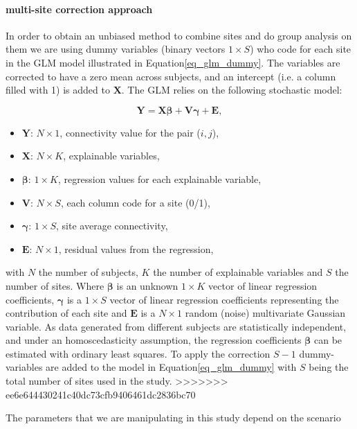 \documentclass[authoryear]{elsarticle}
\begin{document}
\paragraph{multi-site correction approach} 
In order to obtain an unbiased method to combine sites and do group analysis on them we are using dummy variables (binary vectors $1\times S$) who code for each site in the GLM model illustrated in Equation\ref{eq_glm_dummy}. The variables are corrected to have a zero mean across subjects, and an intercept (i.e. a column filled with 1) is added to $\mathbf{X}$. The GLM relies on the following stochastic model:

\begin{equation}
 \label{eq_glm_dummy}
  \mathbf{Y} = \mathbf{X}\mathbf{\beta} + \mathbf{V}\mathbf{\gamma}+ \mathbf{E},
\end{equation}
\begin{itemize}
  \item $\mathbf{Y}$: $N\times 1$, connectivity value for the pair ($i,j$),
  \item $\mathbf{X}$: $N\times K$, explainable variables,
  \item $\mathbf{\beta}$: $1 \times K$, regression values for each explainable variable,
  \item $\mathbf{V}$: $N\times S$, each column code for a site (0/1),
  \item $\mathbf{\gamma}$: $1\times S$, site average connectivity,
  \item $\mathbf{E}$: $N\times 1$, residual values from the regression,
\end{itemize}
 
with $N$ the number of subjects, $K$ the number of explainable variables and $S$ the number of sites. Where $\mathbf{\beta}$ is an unknown $1\times K$ vector of linear regression coefficients, $\mathbf{\gamma}$ is a $1\times S$ vector of linear regression coefficients representing the contribution of each site and $\mathbf{E}$ is a $N\times 1$ random (noise) multivariate Gaussian variable. As data generated from different subjects are statistically independent, and under an homoscedasticity assumption, the regression coefficients $\mathbf{\beta}$ can be estimated with ordinary least squares. To apply the correction $S-1$ dummy-variables are added to the model in Equation\ref{eq_glm_dummy} with $S$ being the total number of sites used in the study.
>>>>>>> ee6e644430241c40dc73cfb9406461dc2836bc70


The parameters that we are manipulating in this study depend on the scenario 
\end{document}
